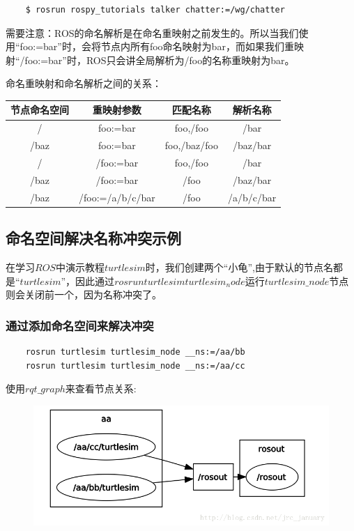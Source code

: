 \documentclass[9pt, oneside]{book}
\begin{document}
\begin{verbatim}
    $ rosrun rospy_tutorials talker chatter:=/wg/chatter 
\end{verbatim}

需要注意：ROS的命名解析是在命名重映射之前发生的。所以当我们使用“foo:=bar”时，会将节点内所有foo命名映射为bar，而如果我们重映射“/foo:=bar”时，ROS只会讲全局解析为/foo的名称重映射为bar。

命名重映射和命名解析之间的关系：

\begin{table}[H]
    \centering
    \begin{tabular}{c|c|c|c}
    \hline
    节点命名空间 & 重映射参数            & 匹配名称         & 解析名称       \\ \hline
    /      & foo:=bar         & foo,/foo     & /bar       \\ \hline
    /baz   & foo:=bar         & foo,/baz/foo & /baz/bar   \\ \hline
    /      & /foo:=bar        & foo,/foo     & /bar       \\ \hline
    /baz   & /foo:=bar        & /foo         & /baz/bar   \\ \hline
    /baz   & /foo:=/a/b/c/bar & /foo         & /a/b/c/bar \\ \hline
    \end{tabular}
\end{table}

\subsection{命名空间解决名称冲突示例}

在学习$ROS$中演示教程$turtlesim$时，我们创建两个“小龟”,由于默认的节点名都是“$turtlesim$”，因此通过$rosrun turtlesim turtlesim_node$运行$turtlesim\_node$节点则会关闭前一个，因为名称冲突了。

\subsubsection{通过添加命名空间来解决冲突}

\begin{verbatim}
    rosrun turtlesim turtlesim_node __ns:=/aa/bb
    rosrun turtlesim turtlesim_node __ns:=/aa/cc
\end{verbatim}

使用$rqt\_graph$来查看节点关系:

\begin{figure}[H]
    \centering
    \includegraphics[width = 0.5\linewidth]{image/namespace_eg1.png}
\end{figure}
\end{document}
